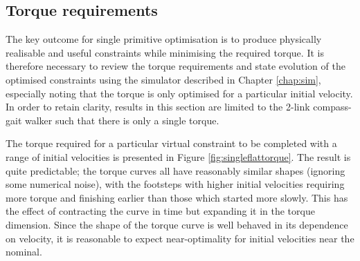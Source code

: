 \subsection{Torque requirements}
The key outcome for single primitive optimisation is to produce physically realisable and useful constraints while minimising the required torque. It is therefore necessary to review the torque requirements and state evolution of the optimised constraints using the simulator described in Chapter \ref{chap:sim}, especially noting that the torque is only optimised for a particular initial velocity. In order to retain clarity, results in this section are limited to the 2-link compass-gait walker such that there is only a single torque.

The torque required for a particular virtual constraint to be completed with a range of initial velocities is presented in Figure \ref{fig:singleflattorque}. The result is quite predictable; the torque curves all have reasonably similar shapes (ignoring some numerical noise), with the footsteps with higher initial velocities requiring more torque and finishing earlier than those which started more slowly. This has the effect of contracting the curve in time but expanding it in the torque dimension. Since the shape of the torque curve is well behaved in its dependence on velocity, it is reasonable to expect near-optimality for initial velocities near the nominal.

